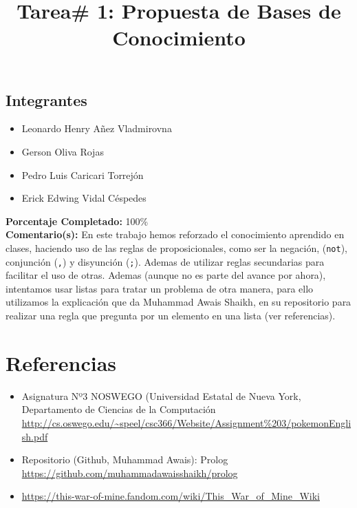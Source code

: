 \documentclass[10pt,letterpaper]{article}
\title{Tarea\# 1: Propuesta de Bases de Conocimiento}
\begin{document}
\maketitle
\subsection*{Integrantes}
\begin{itemize}
\item Leonardo Henry Añez Vladmirovna
\item Gerson Oliva Rojas
\item Pedro Luis Caricari Torrejón
\item Erick Edwing Vidal Céspedes
\end{itemize}
\textbf{Porcentaje Completado:} 100\% \\
\textbf{Comentario(s):} En este trabajo hemos reforzado el conocimiento aprendido en clases, haciendo uso de las reglas de proposicionales, como ser la negación, (\texttt{not}), conjunción (\texttt{,}) y disyunción (\texttt{;}). Ademas de utilizar reglas secundarias para facilitar el uso de otras. Ademas (aunque no es parte del avance por ahora), intentamos usar listas para tratar un problema de otra manera, para ello utilizamos la explicación que da Muhammad Awais Shaikh, en su repositorio para realizar una regla que pregunta por un elemento en una lista (ver referencias).







\section*{Referencias}
\begin{itemize}
\item Asignatura Nº3 NOSWEGO (Universidad Estatal de Nueva York, Departamento de Ciencias de la Computación \url{http://cs.oswego.edu/~speel/csc366/Website/Assignment%203/pokemonEnglish.pdf}
\item Repositorio (Github, Muhammad Awais): Prolog \url{https://github.com/muhammadawaisshaikh/prolog}
\item \url{https://this-war-of-mine.fandom.com/wiki/This_War_of_Mine_Wiki}
\end{itemize}
\end{document}
